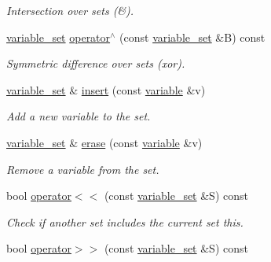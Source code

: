 \begin{DoxyCompactItemize}
\begin{DoxyCompactList}\small\item\em Intersection over sets (\&). \end{DoxyCompactList}\item 
\hyperlink{classmerlin_1_1variable__set}{variable\+\_\+set} \hyperlink{classmerlin_1_1variable__set_a395a46321acea6fe102c661a67cd0879}{operator$^\wedge$} (const \hyperlink{classmerlin_1_1variable__set}{variable\+\_\+set} \&B) const 
\begin{DoxyCompactList}\small\item\em Symmetric difference over sets (xor). \end{DoxyCompactList}\item 
\hyperlink{classmerlin_1_1variable__set}{variable\+\_\+set} \& \hyperlink{classmerlin_1_1variable__set_a03e6bff676ce033ec3cd28c141f43828}{insert} (const \hyperlink{classmerlin_1_1variable}{variable} \&v)\hypertarget{classmerlin_1_1variable__set_a03e6bff676ce033ec3cd28c141f43828}{}\label{classmerlin_1_1variable__set_a03e6bff676ce033ec3cd28c141f43828}

\begin{DoxyCompactList}\small\item\em Add a new variable to the set. \end{DoxyCompactList}\item 
\hyperlink{classmerlin_1_1variable__set}{variable\+\_\+set} \& \hyperlink{classmerlin_1_1variable__set_a385b8b219c5dfa11f181f21da30bb5a2}{erase} (const \hyperlink{classmerlin_1_1variable}{variable} \&v)\hypertarget{classmerlin_1_1variable__set_a385b8b219c5dfa11f181f21da30bb5a2}{}\label{classmerlin_1_1variable__set_a385b8b219c5dfa11f181f21da30bb5a2}

\begin{DoxyCompactList}\small\item\em Remove a variable from the set. \end{DoxyCompactList}\item 
bool \hyperlink{classmerlin_1_1variable__set_aa88748563d3cc40889a07e6ca1775503}{operator$<$$<$} (const \hyperlink{classmerlin_1_1variable__set}{variable\+\_\+set} \&S) const \hypertarget{classmerlin_1_1variable__set_aa88748563d3cc40889a07e6ca1775503}{}\label{classmerlin_1_1variable__set_aa88748563d3cc40889a07e6ca1775503}

\begin{DoxyCompactList}\small\item\em Check if another set includes the current set {\itshape this}. \end{DoxyCompactList}\item 
bool \hyperlink{classmerlin_1_1variable__set_ad6f331c4956f7d0d2fc9831d5e0a5205}{operator$>$$>$} (const \hyperlink{classmerlin_1_1variable__set}{variable\+\_\+set} \&S) const \hypertarget{classmerlin_1_1variable__set_ad6f331c4956f7d0d2fc9831d5e0a5205}{}\label{classmerlin_1_1variable__set_ad6f331c4956f7d0d2fc9831d5e0a5205}


\end{DoxyCompactItemize}
